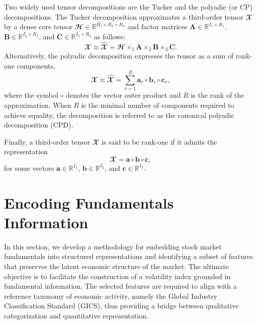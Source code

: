 \documentclass[pdflatex,sn-mathphys-num]{sn-jnl}%
\theoremstyle{thmstyleone}%
\theoremstyle{thmstyletwo}%
\theoremstyle{thmstylethree}%
\begin{document}
Two widely used tensor decompositions are the Tucker and the polyadic (or CP) decompositions. The Tucker decomposition approximates a third-order tensor $\mathbfcal{X}$ by a dense core tensor $\mathbfcal{H} \in \mathbb{R}^{R_1 \times R_2 \times R_3}$ and factor matrices $\mathbf{A} \in \mathbb{R}^{I_1 \times R_1}$, $\mathbf{B} \in \mathbb{R}^{I_2 \times R_2}$, and $\mathbf{C} \in \mathbb{R}^{I_3 \times R_3}$ as follows:
\begin{equation}
	\mathbfcal{X} \approx \widehat{\mathbfcal{X}} = \mathbfcal{H} \times_1 \mathbf{A} \times_2 \mathbf{B} \times_3 \mathbf{C}.
\end{equation}
Alternatively, the polyadic decomposition expresses the tensor as a sum of rank-one components,
\begin{equation}
	\label{Eq:CP}
	\mathbfcal{X} \approx \widehat{\mathbfcal{X}} = \sum_{r=1}^{R} \mathbf{a}_r \circ \mathbf{b}_r \circ \mathbf{c}_r,
\end{equation}
where the symbol $\circ$ denotes the vector outer product and $R$ is the rank of the approximation. When $R$ is the minimal number of components required to achieve equality, the decomposition is referred to as the canonical polyadic decomposition (CPD).

Finally, a third-order tensor $\mathbfcal{X}$ is said to be rank-one if it admits the representation
\begin{equation}
	\mathbfcal{X} = \mathbf{a} \circ \mathbf{b} \circ \mathbf{c},
\end{equation}
for some vectors $\mathbf{a} \in \mathbb{R}^{I_1}$, $\mathbf{b} \in \mathbb{R}^{I_2}$, and $\mathbf{c} \in \mathbb{R}^{I_3}$.



\section{Encoding Fundamentals Information}
\label{Section:Funadamentals}

In this section, we develop a methodology for embedding stock market fundamentals into structured representations and identifying a subset of features that preserves the latent economic structure of the market. The ultimate objective is to facilitate the construction of a volatility index grounded in fundamental information. The selected features are required to align with a reference taxonomy of economic activity, namely the Global Industry Classification Standard (GICS), thus providing a bridge between qualitative categorization and quantitative representation.
\end{document}
